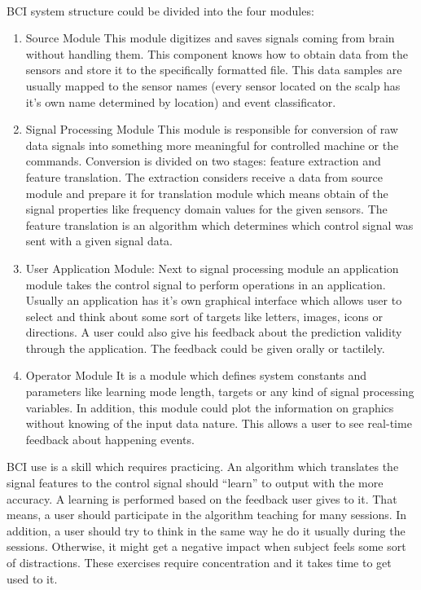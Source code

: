 \documentclass[12pt]{article}
\begin{document}
\paragraph{}
BCI system structure could be divided into the four modules\cite{bci_shivangi}:
\begin{enumerate}
\item Source Module
This module digitizes and saves signals coming from brain without handling them. This component knows how to obtain data from the sensors and store it to the specifically formatted file. This data samples are usually mapped to the sensor names (every sensor located on the scalp has it's own name determined by location) and event classificator. 
\item Signal Processing Module
This module is responsible for conversion of raw data signals into something more meaningful for controlled machine or the commands. Conversion is divided on two stages: feature extraction and feature translation. The extraction considers receive a data from source module and prepare it for translation module which means obtain of the signal properties like frequency domain values for the given sensors. The feature translation is an algorithm which determines which control signal was sent with a given signal data. 
\item User Application Module:
Next to signal processing module an application module takes the control signal to perform operations in an application. Usually an application has it's own graphical interface which allows user to select and think about some sort of targets like letters, images, icons or directions. A user could also give his feedback about the prediction validity through the application. The feedback could be given orally or tactilely. 
\item Operator Module
It is a module which defines system constants and parameters like learning mode length, targets or any kind of signal processing variables. In addition, this module could plot the information on graphics without knowing of the input data nature. This allows a user to see real-time feedback about happening events.
\end{enumerate}

BCI use is a skill which requires practicing. An algorithm which translates the signal features to the control signal should ``learn'' to output with the more accuracy. A learning is performed based on the feedback user gives to it. That means, a user should participate in the algorithm teaching for many sessions. In addition, a user should try to think in the same way he do it usually during the sessions. Otherwise, it might get a negative impact when subject feels some sort of distractions. These exercises require concentration and it takes time to get used to it.
\end{document}
